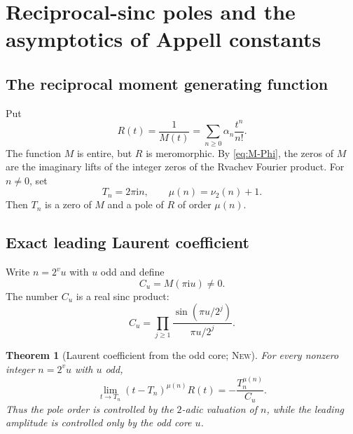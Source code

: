 \documentclass[11pt,oneside]{article}
\theoremstyle{frontier}
\newtheorem{theorem}{Theorem}[section]
\theoremstyle{definition}
\theoremstyle{remark}
\newcommand{\ii}{\mathrm i}
\newcommand{\vtwo}{\nu_2}
\newcommand{\statusnew}{\textsc{New}}
\begin{document}
\section{Reciprocal-sinc poles and the asymptotics of Appell constants}
\label{sec:poles}

\subsection{The reciprocal moment generating function}

Put
\begin{equation}
 R(t)=\frac1{M(t)}
 =\sum_{n\ge0}\alpha_n\frac{t^n}{n!}.
 \label{eq:R-def}
\end{equation}
The function $M$ is entire, but $R$ is meromorphic.  By \eqref{eq:M-Phi}, the zeros of $M$ are the
imaginary lifts of the integer zeros of the Rvachev Fourier product.  For $n\ne0$, set
\begin{equation}
 T_n=2\pi\ii n,
 \qquad
 \mu(n)=\vtwo(n)+1.
 \label{eq:T-mu}
\end{equation}
Then $T_n$ is a zero of $M$ and a pole of $R$ of order $\mu(n)$.

\subsection{Exact leading Laurent coefficient}

Write $n=2^vu$ with $u$ odd and define
\begin{equation}
 C_u=M(\pi\ii u)\ne0.
 \label{eq:Cu}
\end{equation}
The number $C_u$ is a real sinc product:
\begin{equation}
 C_u=\prod_{j\ge1}\frac{\sin(\pi u/2^j)}{\pi u/2^j}.
 \label{eq:Cu-product}
\end{equation}

\begin{theorem}[Laurent coefficient from the odd core; \statusnew]
\label{thm:Laurent-leading}
For every nonzero integer $n=2^vu$ with $u$ odd,
\begin{equation}
 \boxed{
 \lim_{t\to T_n}(t-T_n)^{\mu(n)}R(t)
 =-\frac{T_n^{\mu(n)}}{C_u}.
 }
 \label{eq:Laurent-leading}
\end{equation}
Thus the pole order is controlled by the $2$-adic valuation of $n$, while the leading amplitude is
controlled only by the odd core $u$.
\end{theorem}
\end{document}
